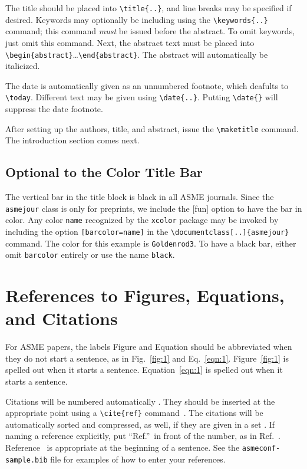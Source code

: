\documentclass[subscriptcorrection,upint,varvw,mathalfa=cal=euler,barcolor=black,balance,hyphenate,french,pdf-a,nolists]{asmejour}
\begin{document}
The title should be placed into \verb|\title{..}|, and line breaks may be specified if desired. Keywords may optionally be including using the \verb|\keywords{..}| command; this command \textit{must} be issued before the abstract. To omit keywords, just omit this command. Next, the abstract text must be placed into \verb|\begin{abstract}|\ldots\verb|\end{abstract}|. The abstract will automatically be italicized.

The date is automatically given as an unnumbered footnote, which deafults to \verb|\today|. Different text may be given using \verb|\date{..}|. Putting \verb|\date{}| will suppress the date footnote.

After setting up the authors, title, and abstract, issue the \verb|\maketitle| command. The introduction section comes next.

\subsection{Optional to the Color Title Bar}
The vertical bar in the title block is black in all ASME journals. Since the \texttt{asmejour} class is only for preprints, we include the [fun] option to have the bar in color. Any color \texttt{name} recognized by the \texttt{xcolor} package may be invoked by including the option \texttt{[barcolor=name]} in the \verb|\documentclass[..]{asmejour}| command. The color for this example is \texttt{Goldenrod3}. To have a black bar, either omit \texttt{barcolor} entirely or use the name \texttt{black}.


\section{References to Figures, Equations, and Citations}

For ASME papers, the labels Figure and Equation should be abbreviated when they do not start a sentence, as in Fig.~\ref{fig:1} and Eq.~\eqref{eqn:1}. Figure~\ref{fig:1} is spelled out when it starts a sentence. Equation~\eqref{eqn:1} is spelled out when it starts a sentence.

Citations will be numbered automatically \cite{DKE1969}. They should be inserted at the appropriate point using a \verb|\cite{ref}| command~\cite{toohey2007,gibson2008}. The citations will be automatically sorted and compressed, as well, if they are given in a set \cite{stevens1999, DKE1969, wions2006, oligaria2011, mollen2014, smith2014, apple2019}. If naming a reference explicitly, put ``Ref.''\ in front of the number, as in Ref.~\cite{smith2014}. Reference~\cite{smith2014} is appropriate at the beginning of a sentence.
See the \texttt{asmeconf-sample.bib} file for examples of how to enter your references.
\end{document}
